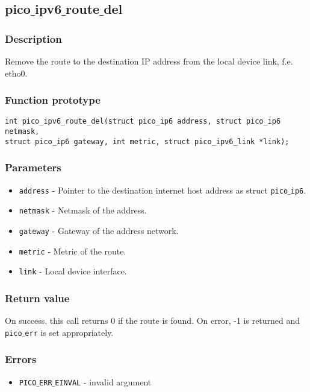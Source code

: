 \subsection{pico$\_$ipv6$\_$route$\_$del}

\subsubsection*{Description}
Remove the route to the destination IP address from the local device link, f.e. etho0.

\subsubsection*{Function prototype}
\begin{verbatim}
int pico_ipv6_route_del(struct pico_ip6 address, struct pico_ip6 netmask,
struct pico_ip6 gateway, int metric, struct pico_ipv6_link *link); 
\end{verbatim}

\subsubsection*{Parameters}
\begin{itemize}[noitemsep]
\item \texttt{address} - Pointer to the destination internet host address as struct \texttt{pico$\_$ip6}.
\item \texttt{netmask} - Netmask of the address.
\item \texttt{gateway} - Gateway of the address network.
\item \texttt{metric} - Metric of the route.
\item \texttt{link} - Local device interface.
\end{itemize}

\subsubsection*{Return value}
On success, this call returns 0 if the route is found.
On error, -1 is returned and \texttt{pico$\_$err} is set appropriately.

\subsubsection*{Errors}
\begin{itemize}[noitemsep]
\item \texttt{PICO$\_$ERR$\_$EINVAL} - invalid argument
\end{itemize}

